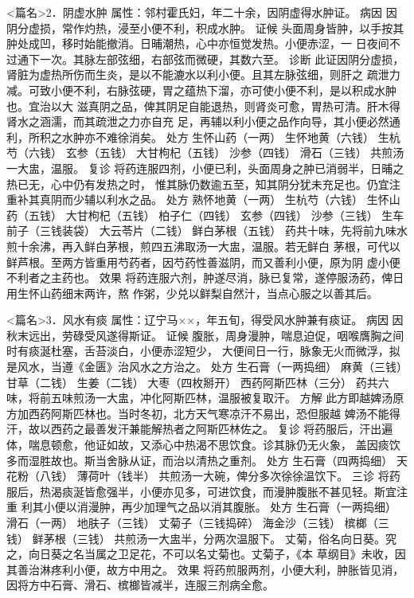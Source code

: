 \documentclass[a4paper,12pt,UTF8,twoside]{ctexbook}
\begin{document}
<篇名>2．阴虚水肿
属性：邻村霍氏妇，年二十余，因阴虚得水肿证。 
病因 因阴分虚损，常作灼热，浸至小便不利，积成水肿。 
证候 头面周身皆肿，以手按其肿处成凹，移时始能撤消。日晡潮热，心中亦恒觉发热。小便赤涩，一 
日夜间不过通下一次。其脉左部弦细，右部弦而微硬，其数六至。 
诊断 此证因阴分虚损，肾脏为虚热所伤而生炎，是以不能漉水以利小便。且其左脉弦细，则肝之 
疏泄力减。可致小便不利，右脉弦硬，胃之蕴热下溜，亦可使小便不利，是以积成水肿也。宜治以大 
滋真阴之品，俾其阴足自能退热，则肾炎可愈，胃热可清。肝木得肾水之涵濡，而其疏泄之力亦自充 
足，再辅以利小便之品作向导，其小便必然通利，所积之水肿亦不难徐消矣。 
处方 生怀山药（一两） 生怀地黄（六钱） 生杭芍（六钱） 玄参（五钱） 
大甘枸杞（五钱） 沙参（四钱） 滑石（三钱） 
共煎汤一大盅，温服。 
复诊 将药连服四剂，小便已利，头面周身之肿已消弱半，日晡之热已无，心中仍有发热之时， 
惟其脉仍数逾五至，知其阴分犹未充足也。仍宜注重补其真阴而少辅以利水之品。 
处方 熟怀地黄（一两） 生杭芍（六钱） 生怀山药（五钱） 大甘枸杞（五钱） 
柏子仁（四钱） 玄参（四钱） 沙参（三钱） 生车前子（三钱装袋） 
大云苓片（二钱） 鲜白茅根（五钱） 
药共十味，先将前九味水煎十余沸，再入鲜白茅根，煎四五沸取汤一大盅，温服。若无鲜白 
茅根，可代以鲜芦根。至两方皆重用芍药者，因芍药性善滋阴，而又善利小便，原为阴 
虚小便不利者之主药也。 
效果 将药连服六剂，肿遂尽消，脉已复常，遂停服汤药，俾日用生怀山药细末两许，熬 
作粥，少兑以鲜梨自然汁，当点心服之以善其后。 

<篇名>3．风水有痰
属性：辽宁马××，年五旬，得受风水肿兼有痰证。 
病因 因秋末远出，劳碌受风遂得斯证。 
证候 腹胀，周身漫肿，喘息迫促，咽喉膺胸之间时有痰涎杜塞，舌苔淡白，小便赤涩短少， 
大便间日一行，脉象无火而微浮，拟是风水，当遵《金匮》治风水之方治之。 
处方 生石膏（一两捣细） 麻黄（三钱） 甘草（二钱） 生姜（二钱） 
大枣（四枚掰开） 西药阿斯匹林（三分） 
药共六味，将前五味煎汤一大盅，冲化阿斯匹林，温服被复取汗。 
方解 此方即越婢汤原方加西药阿斯匹林也。当时冬初，北方天气寒凉汗不易出，恐但服越 
婢汤不能得汗，故以西药之最善发汗兼能解热者之阿斯匹林佐之。 
复诊 将药服后，汗出遍体，喘息顿愈，他证如故，又添心中热渴不思饮食。诊其脉仍无火象， 
盖因痰饮多而湿胜故也。斯当舍脉从证，而治以清热之重剂。 
处方 生石膏（四两捣细） 天花粉（八钱） 薄荷叶（钱半） 
共煎汤一大碗，俾分多次徐徐温饮下。 
三诊 将药服后，热渴痰涎皆愈强半，小便亦见多，可进饮食，而漫肿腹胀不甚见轻。斯宜注重 
利其小便以消漫肿，再少加理气之品以消其腹胀。 
处方 生石膏（一两捣细） 滑石（一两） 地肤子（三钱） 丈菊子（三钱捣碎） 
海金沙（三钱） 槟榔（三钱） 鲜茅根（三钱） 
共煎汤一大盅半，分两次温服下。 
丈菊，俗名向日葵。究之，向日葵之名当属之卫足花，不可以名丈菊也。丈菊子，《本 
草纲目》未收，因其善治淋疼利小便，故方中用之。 
效果 将药煎服两剂，小便大利，肿胀皆见消，因将方中石膏、滑石、槟榔皆减半，连服三剂病全愈。 
\end{document}
